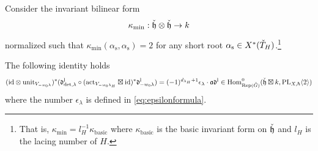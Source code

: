 \documentclass[reqno]{amsart}
\numberwithin{equation}{section}
\numberwithin{equation}{section}
\begin{document}
Consider the invariant bilinear form \begin{equation}\label{eq:kappamin}\kappa_{\min}:\check{\mathfrak{h}}\otimes\check{\mathfrak{h}}\to k\end{equation} normalized such that $\kappa_{\min}(\alpha_{\mathrm{s}},\alpha_{\mathrm{s}})=2$ for any short root $\alpha_{\mathrm{s}}\in X^*(\check{T}_H)$.\footnote{That is, $\kappa_{\min}=l_H^{-1}\kappa_{\mathrm{basic}}$ where $\kappa_{\mathrm{basic}}$ is the basic invariant form on $\check{\mathfrak{h}}$ and $l_H$ is the lacing number of $H$.}

\begin{prop}\label{prop:localunit}
    The following identity holds \begin{equation}\label{eq:localunit1}(\mathrm{id}\otimes\mathrm{unit}_{V_{-w_0\lambda}})^*(\mathfrak{d}_{\det,\lambda}^{\mathrm{l}}\circ (\mathrm{act}_{V_{-w_0\lambda_H}}\boxtimes \mathrm{id})^* \mathfrak{d}_{-w_0\lambda}^{\mathrm{l}})=(-1)^{d_{\lambda_H}+1 }\epsilon_{\lambda}\cdot \mathfrak{a}\mathfrak{d}^{\mathrm{l}}\in \operatorname{Hom}^0_{\operatorname{Rep}(\check{G})}(\check{\mathfrak{h}}\boxtimes k, \mathrm{PL}_{X,\hbar}\langle 2\rangle)\end{equation} where the number $\epsilon_{\lambda}$ is defined in \eqref{eq:epsilonformula}.
\end{prop}
\end{document}

